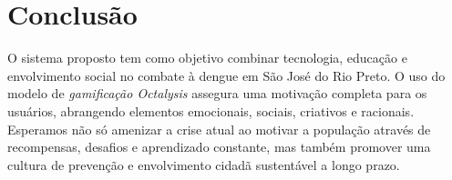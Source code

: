 \documentclass[a5paper, 12pt]{article}
\begin{document}
\newpage
\section{Conclusão}
O sistema proposto tem como objetivo combinar tecnologia, educação e envolvimento social no combate à dengue em São José do Rio Preto. O uso do modelo de \textit{gamificação Octalysis} assegura uma motivação completa para os usuários, abrangendo elementos emocionais, sociais, criativos e racionais. Esperamos não só amenizar a crise atual ao motivar a população através de recompensas, desafios e aprendizado constante, mas também promover uma cultura de prevenção e envolvimento cidadã sustentável a longo prazo.
\end{document}
